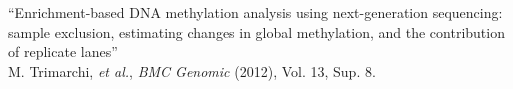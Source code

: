 ``Enrichment-based DNA methylation analysis using next-generation sequencing:
sample exclusion, estimating changes in global methylation, and the contribution of replicate lanes'' \\
\small{M. Trimarchi, \textit{et al.}, \textit{BMC Genomic} (2012), Vol. 13, Sup. 8.} \\
